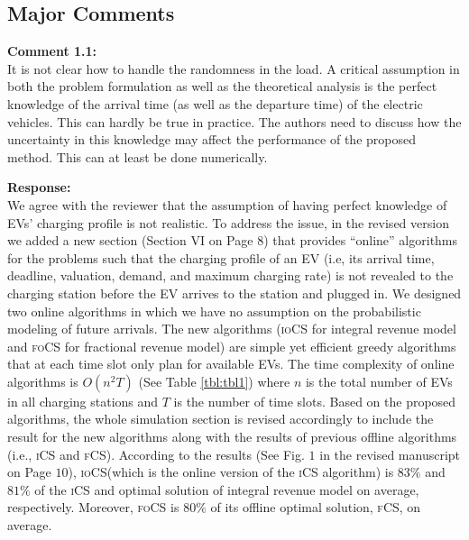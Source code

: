 \documentclass[11pt]{article}
\newcommand{\focs}{\textsc{foCS}\xspace}
\newcommand{\iocs}{\textsc{ioCS}\xspace}
\newcommand{\fcs}{\textsc{fCS}\xspace}
\newcommand{\ics}{\textsc{iCS}\xspace}
\begin{document}
\subsection{Major Comments}

\vspace{5mm}
{\color{blue}
\noindent\textbf{Comment 1.1:}\\
It is not clear how to handle the randomness in the load. A critical assumption in both the problem formulation as well as the theoretical analysis is the perfect knowledge of the arrival time (as well as the departure time) of the electric vehicles. This can hardly be true in practice. The authors need to discuss how the uncertainty in this knowledge may affect the performance of the proposed method. This can at least be done numerically.
}

\vspace{5mm}
\noindent\textbf{Response:}\\
We agree with the reviewer that the assumption of having perfect knowledge of EVs' charging profile is not realistic. To address the issue, in the revised version we added a new section (Section VI on Page $8$) that provides ``online'' algorithms for the problems such that the charging profile of an EV (i.e, its arrival time, deadline, valuation, demand, and maximum charging rate) is not revealed to the charging station before the EV arrives to the station and plugged in. We designed two online algorithms in which we have no assumption on the probabilistic modeling of future arrivals. The new algorithms (\iocs for integral revenue model and \focs for fractional revenue model) are simple yet efficient greedy algorithms that at each time slot only plan for available EVs. The time complexity of online algorithms is $O(n^2T)$ (See Table \ref{tbl:tbl1}) where $n$ is the total number of EVs in all charging stations and $T$ is the number of time slots. Based on the proposed algorithms, the whole simulation section is revised accordingly to include the result for the new algorithms along with the results of previous offline algorithms (i.e., \ics and \fcs). According to the results (See Fig. $1$ in the revised manuscript on Page $10$), \iocs (which is the online version of the \ics algorithm) is $83\%$ and $81\%$ of the \ics and optimal solution of integral revenue model on average, respectively. Moreover, \focs is $80\%$ of its offline optimal solution, \fcs, on average.
\end{document}
